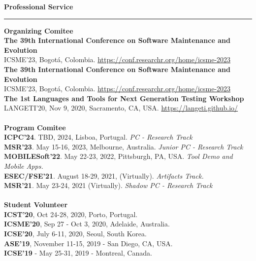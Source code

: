 \documentclass[letterpaper,11pt,oneside]{article}
\begin{document}
\noindent \LARGE{\textbf{Professional Service}} \\
\vspace{-2ex}
\hrule 
\normalsize
\vspace{2ex}
\noindent \large{\textbf{Organizing Comitee}}\\
\indent\textbf{The 39th International Conference on Software Maintenance and Evolution}\\
\indent ICSME'23, Bogotá, Colombia. \href{https://conf.researchr.org/home/icsme-2023}{https://conf.researchr.org/home/icsme-2023} \\
\indent\textbf{The 39th International Conference on Software Maintenance and Evolution}\\
\indent ICSME'23, Bogotá, Colombia. \href{https://conf.researchr.org/home/icsme-2023}{https://conf.researchr.org/home/icsme-2023} \\
\indent\textbf{The 1st Languages and Tools for Next Generation Testing Workshop} \\
\indent LANGETI'20, Nov 9, 2020, Sacramento, CA, USA. \href{https://langeti.github.io/}{https://langeti.github.io/} \\
\\
\noindent \large{\textbf{Program Comitee}} \\
\indent \textbf{ICPC'24}. TBD, 2024, Lisboa, Portugal. \textit{PC - Research Track} \\
\indent \textbf{MSR'23}. May 15-16, 2023, Melbourne, Australia. \textit{Junior PC - Research Track} \\
\indent \textbf{MOBILESoft'22}. May 22-23, 2022, Pittsburgh, PA, USA. \textit{Tool Demo and Mobile Apps.} \\
\indent \textbf{ESEC/FSE'21}. August 18-29, 2021, (Virtually). \textit{Artifacts Track.} \\
\indent \textbf{MSR'21}. May 23-24, 2021 (Virtually). \textit{Shadow PC - Research Track} \\
\\
\noindent \large{\textbf{Student Volunteer}} \\
\indent \textbf{ICST'20}, Oct 24-28, 2020, Porto, Portugal. \\
\indent \textbf{ICSME'20}, Sep 27 - Oct 3, 2020, Adelaide, Australia. \\
\indent \textbf{ICSE'20}, July 6-11, 2020, Seoul, South Korea. \\
\indent \textbf{ASE'19}, November 11-15, 2019 - San Diego, CA, USA. \\
\indent \textbf{ICSE'19} - May 25-31, 2019 - Montreal, Canada. \\
\end{document}
